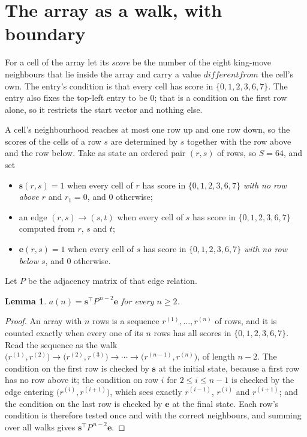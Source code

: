 \documentclass[11pt,a4paper]{article}
\theoremstyle{plain}
\newtheorem{lemma}[theorem]{Lemma}
\theoremstyle{definition}
\begin{document}
\section{The array as a walk, with boundary}

For a cell of the array let its \emph{score} be the number of the eight king-move neighbours that lie inside
the array and carry a value $different from$ the cell's own. The entry's condition is that every cell
has score in $\{0,1,2,3,6,7\}$. The entry also fixes the top-left entry to be $0$; that is a condition on the first row alone, so it restricts the start vector and nothing else.

A cell's neighbourhood reaches at most one row up and one row down, so the scores of the
cells of a row $s$ are determined by $s$ together with the row above and the row below.
Take as state an ordered pair $(r,s)$ of rows, so $S=64$, and set
\begin{itemize}
\item $\mathbf{s}(r,s)=1$ when every cell of $r$ has score in $\{0,1,2,3,6,7\}$ \emph{with no row
above $r$} and $r_1=0$, and $0$ otherwise;
\item an edge $(r,s)\to(s,t)$ when every cell of $s$ has score in $\{0,1,2,3,6,7\}$ computed from
$r$, $s$ and $t$;
\item $\mathbf{e}(r,s)=1$ when every cell of $s$ has score in $\{0,1,2,3,6,7\}$ \emph{with no row
below $s$}, and $0$ otherwise.
\end{itemize}
Let $P$ be the adjacency matrix of that edge relation.

\begin{lemma}\label{lem:walk}
$a(n)=\mathbf{s}^{\!\top}P^{\,n-2}\mathbf{e}$ for every $n\ge2$.
\end{lemma}

\begin{proof}
An array with $n$ rows is a sequence $r^{(1)},\dots,r^{(n)}$ of rows, and it is counted
exactly when every one of its $n$ rows has all scores in $\{0,1,2,3,6,7\}$. Read the sequence as the
walk $\bigl(r^{(1)},r^{(2)}\bigr)\to\bigl(r^{(2)},r^{(3)}\bigr)\to\cdots\to
\bigl(r^{(n-1)},r^{(n)}\bigr)$, of length $n-2$. The condition on the first row is
checked by $\mathbf{s}$ at the initial state, because a first row has no row above it; the
condition on row $i$ for $2\le i\le n-1$ is checked by the edge entering
$\bigl(r^{(i)},r^{(i+1)}\bigr)$, which sees exactly $r^{(i-1)}$, $r^{(i)}$ and
$r^{(i+1)}$; and the condition on the last row is checked by $\mathbf{e}$ at the final
state. Each row's condition is therefore tested once and with the correct neighbours, and
summing over all walks gives $\mathbf{s}^{\!\top}P^{\,n-2}\mathbf{e}$.
\end{proof}
\end{document}
